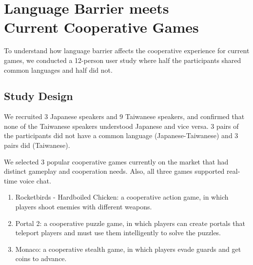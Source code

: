 \section{Language Barrier meets\\ Current Cooperative Games}


To understand how language barrier affects the cooperative experience for current games, we conducted a 12-person user study where half the participants shared common languages and half did not. 

\subsection{Study Design}

We recruited 3 Japanese speakers and 9 Taiwanese speakers, and confirmed that none of the Taiwanese speakers understood Japanese and vice versa. 3 pairs of the participants did not have a common language (Japanese-Taiwanese) and 3 pairs did (Taiwanese).

We selected 3 popular cooperative games currently on the market that had distinct gameplay and cooperation needs. Also, all three games supported real-time voice chat. 
\begin{enumerate}
    \item Rocketbirds - Hardboiled Chicken: a cooperative action game, in which players shoot enemies with different weapons.
    
    \item Portal 2: a cooperative puzzle game, in which players can create portals that teleport players and must use them intelligently to solve the puzzles.
    
    \item Monaco: a cooperative stealth game, in which players evade guards and get coins to advance.
\end{enumerate}

